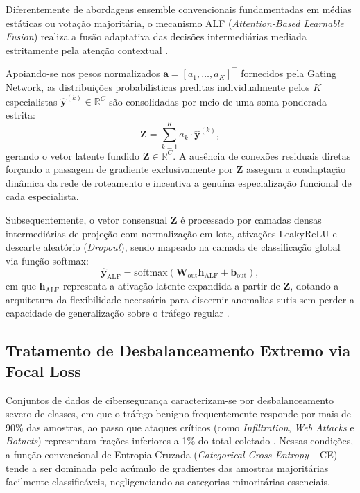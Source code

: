 Diferentemente de abordagens ensemble convencionais fundamentadas em médias estáticas ou votação majoritária, o mecanismo ALF (\emph{Attention-Based Learnable Fusion}) realiza a fusão adaptativa das decisões intermediárias mediada estritamente pela atenção contextual \cite{alfmoe2026}.

Apoiando-se nos pesos normalizados $\mathbf{a} = [a_1, \dots, a_K]^\top$ fornecidos pela Gating Network, as distribuições probabilísticas preditas individualmente pelos $K$ especialistas $\hat{\mathbf{y}}^{(k)} \in \mathbb{R}^C$ são consolidadas por meio de uma soma ponderada estrita:
\begin{equation}
\label{eq:weighted_sum_fusion}
\mathbf{Z} = \sum_{k=1}^K a_k \cdot \hat{\mathbf{y}}^{(k)},
\end{equation}
gerando o vetor latente fundido $\mathbf{Z} \in \mathbb{R}^C$. A ausência de conexões residuais diretas forçando a passagem de gradiente exclusivamente por $\mathbf{Z}$ assegura a coadaptação dinâmica da rede de roteamento e incentiva a genuína especialização funcional de cada especialista.

Subsequentemente, o vetor consensual $\mathbf{Z}$ é processado por camadas densas intermediárias de projeção com normalização em lote, ativações LeakyReLU e descarte aleatório (\emph{Dropout}), sendo mapeado na camada de classificação global via função softmax:
\begin{equation}
\label{eq:alf_final_softmax}
\hat{\mathbf{y}}_{\mathrm{ALF}} = \mathrm{softmax} \left( \mathbf{W}_{\mathrm{out}} \mathbf{h}_{\mathrm{ALF}} + \mathbf{b}_{\mathrm{out}} \right),
\end{equation}
em que $\mathbf{h}_{\mathrm{ALF}}$ representa a ativação latente expandida a partir de $\mathbf{Z}$, dotando a arquitetura da flexibilidade necessária para discernir anomalias sutis sem perder a capacidade de generalização sobre o tráfego regular \cite{alfmoe2026}.

\subsection{Tratamento de Desbalanceamento Extremo via Focal Loss}
\label{subsec:focal_loss}

Conjuntos de dados de cibersegurança caracterizam-se por desbalanceamento severo de classes, em que o tráfego benigno frequentemente responde por mais de 90\% das amostras, ao passo que ataques críticos (como \emph{Infiltration}, \emph{Web Attacks} e \emph{Botnets}) representam frações inferiores a 1\% do total coletado \cite{ciciot2023, standard2021}. Nessas condições, a função convencional de Entropia Cruzada (\emph{Categorical Cross-Entropy} -- CE) tende a ser dominada pelo acúmulo de gradientes das amostras majoritárias facilmente classificáveis, negligenciando as categorias minoritárias essenciais.

